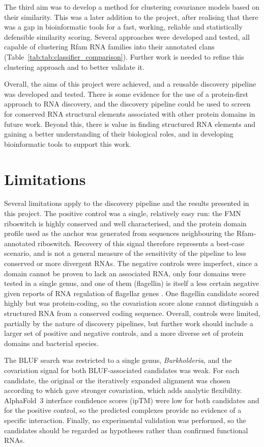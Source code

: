 The third aim was to develop a method for clustering covariance models based on their similarity.
This was a later addition to the project, after realising that there was a gap in bioinformatic tools for a fast, working, reliable and statistically defensible similarity scoring.
Several approaches were developed and tested, all capable of clustering Rfam RNA families into their annotated clans (Table~\ref{tab:tab:classifier_comparison}).
Further work is needed to refine this clustering approach and to better validate it.

Overall, the aims of this project were achieved, and a reusable discovery pipeline was developed and tested.
There is some evidence for the use of a protein-first approach to RNA discovery, and the discovery pipeline could be used to screen for conserved RNA structural elements associated with other protein domains in future work.
Beyond this, there is value in finding structured RNA elements and gaining a better understanding of their biological roles, and in developing bioinformatic tools to support this work.

\section{Limitations}

Several limitations apply to the discovery pipeline and the results presented in this project.
The positive control was a single, relatively easy run: the \ac{FMN} riboswitch is highly conserved and well characterised, and the protein domain profile used as the anchor was generated from sequences neighbouring the Rfam-annotated riboswitch.
Recovery of this signal therefore represents a best-case scenario, and is not a general measure of the sensitivity of the pipeline to less conserved or more divergent RNAs.
The negative controls were imperfect, since a domain cannot be proven to lack an associated RNA, only four domains were tested in a single genus, and one of them (flagellin) is itself a less certain negative given reports of RNA regulation of flagellar genes \citet{Mika2013}.
One flagellin candidate scored highly but was protein-coding, so the covariation score alone cannot distinguish a structured RNA from a conserved coding sequence.
Overall, controls were limited, partially by the nature of discovery pipelines, but further work should include a larger set of positive and negative controls, and a more diverse set of protein domains and bacterial species.

The \ac{BLUF} search was restricted to a single genus, \emph{Burkholderia}, and the covariation signal for both \ac{BLUF}-associated candidates was weak.
For each candidate, the original or the iteratively expanded alignment was chosen according to which gave stronger covariation, which adds analytic flexibility.
AlphaFold~3 interface confidence scores (ipTM) were low for both candidates and for the positive control, so the predicted complexes provide no evidence of a specific interaction.
Finally, no experimental validation was performed, so the candidates should be regarded as hypotheses rather than confirmed functional RNAs.

